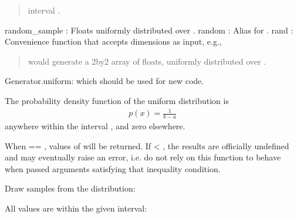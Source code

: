 \documentclass[letterpaper,10pt,english]{sphinxmanual}
\begin{document}
\begin{fulllineitems}
\begin{quote}
interval .
\end{quote}

random\_sample : Floats uniformly distributed over \sphinxcode{\sphinxupquote{{[}0, 1)}}.
random : Alias for .
rand : Convenience function that accepts dimensions as input, e.g.,
\begin{quote}

 would generate a 2\sphinxhyphen{}by\sphinxhyphen{}2 array of floats,
uniformly distributed over \sphinxcode{\sphinxupquote{{[}0, 1)}}.
\end{quote}

Generator.uniform: which should be used for new code.

The probability density function of the uniform distribution is
\begin{equation*}
\begin{split}p(x) = \frac{1}{b - a}\end{split}
\end{equation*}
anywhere within the interval \sphinxcode{\sphinxupquote{{[}a, b)}}, and zero elsewhere.

When  == , values of  will be returned.
If  \textless{} , the results are officially undefined
and may eventually raise an error, i.e. do not rely on this
function to behave when passed arguments satisfying that
inequality condition.

Draw samples from the distribution:

\begin{sphinxVerbatim}[commandchars=\\\{\}]
  
\end{sphinxVerbatim}

All values are within the given interval:

\begin{sphinxVerbatim}[commandchars=\\\{\}]
  
  
\end{sphinxVerbatim}


\end{fulllineitems}
\end{document}
